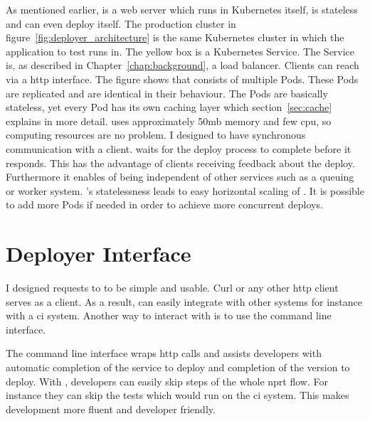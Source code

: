 As mentioned earlier, \deployer{} is a web server which runs in Kubernetes itself, is
stateless and can even deploy itself. The production cluster in
figure~\ref{fig:deployer_architecture} is the same Kubernetes cluster in which the
application to test runs in. The yellow box is a Kubernetes Service. The Service is, as
described in Chapter~\ref{chap:background}, a load balancer. Clients can reach \deployer{}
via a \gls{http} interface. The figure shows that \deployer{} consists of multiple Pods. These
Pods are replicated and are identical in their behaviour. The Pods are basically
stateless, yet every Pod has its own caching layer which section~\ref{sec:cache} explains
in more detail. \deployer{} uses approximately 50mb memory and few \gls{cpu}, so computing
resources are no problem. I designed \deployer{} to have synchronous communication with a
client. \deployer{} waits for the deploy process to complete before it responds. This has
the advantage of clients receiving feedback about the deploy. Furthermore it enables
\deployer{} of being independent of other services such as a queuing or worker
system. \deployer{}'s statelessness leads to easy horizontal scaling of \deployer{}. It is
possible to add more Pods if needed in order to achieve more concurrent deploys.

\section{Deployer Interface}
\label{sec:interface}

I designed requests to \deployer{} to be simple and usable. Curl or any other \gls{http} client
serves as a client. As a result, \deployer{} can easily integrate with other systems for
instance with a \gls{ci} system. Another way to interact with \deployer{} is to use the
\depctl{} command line interface.

The \depctl{} command line interface wraps \gls{http} calls and assists developers with automatic
completion of the service to deploy and completion of the version to deploy. With \depctl{},
developers can easily skip steps of the whole \gls{nprt} flow. For instance they can skip
the tests which would run on the \gls{ci} system. This makes development more fluent and
developer friendly.

